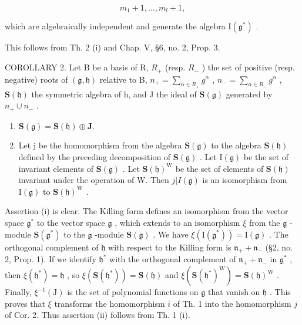 \[
m _ {1} + 1, \dots , m _ {l} + 1,
\]

which are algebraically independent and generate the algebra \(\mathrm{I}(\mathfrak{g}^*)\) .

This follows from Th. 2 (i) and Chap. V, §6, no. 2, Prop. 3.

COROLLARY 2. Let B be a basis of R, \(R_{+}\) (resp. \(R_{-}\) ) the set of positive (resp. negative) roots of \((\mathfrak{g},\mathfrak{h})\) relative to B, \(n_{+}=\sum_{\alpha\in R_{+}}g^{\alpha}\) , \(n_{-}=\sum_{\alpha\in R_{-}}g^{\alpha}\) , \(\mathbf{S}(\mathfrak{h})\) the symmetric algebra of h, and J the ideal of \(\mathbf{S}(\mathfrak{g})\) generated by \(n_{+}\cup n_{-}\) .

\begin{enumerate}
\def\labelenumi{(\roman{enumi})}
\item
  \(\mathbf{S}(\mathfrak{g}) = \mathbf{S}(\mathfrak{h}) \oplus \mathbf{J}.\)
\item
  Let j be the homomorphism from the algebra \(\mathbf{S}(\mathfrak{g})\) to the algebra \(\mathbf{S}(\mathfrak{h})\) defined by the preceding decomposition of \(\mathbf{S}(\mathfrak{g})\) . Let \(\mathrm{I}(\mathfrak{g})\) be the set of invariant elements of \(\mathbf{S}(\mathfrak{g})\) . Let \(\mathbf{S}(\mathfrak{h})^{\mathrm{W}}\) be the set of elements of \(\mathbf{S}(\mathfrak{h})\) invariant under the operation of W. Then \(j|I(\mathfrak{g})\) is an isomorphism from \(\mathrm{I}(\mathfrak{g})\) to \(\mathbf{S}(\mathfrak{h})^{\mathrm{W}}\) .
\end{enumerate}

Assertion (i) is clear. The Killing form defines an isomorphism from the vector space \(\mathfrak{g}^*\) to the vector space \(\mathfrak{g}\) , which extends to an isomorphism \(\xi\) from the \(\mathfrak{g}\) -module \(\mathbf{S}(\mathfrak{g}^*)\) to the \(\mathfrak{g}\) -module \(\mathbf{S}(\mathfrak{g})\) . We have \(\xi (\mathrm{I}(\mathfrak{g}^*)) = \mathrm{I}(\mathfrak{g})\) . The orthogonal complement of \(\mathfrak{h}\) with respect to the Killing form is \(\mathfrak{n}_{+} + \mathfrak{n}_{-}\) (§2, no. 2, Prop. 1). If we identify \(\mathfrak{h}^*\) with the orthogonal complement of \(\mathfrak{n}_{+} + \mathfrak{n}_{-}\) in \(\mathfrak{g}^*\) , then \(\xi (\mathfrak{h}^*) = \mathfrak{h}\) , so \(\xi (\mathbf{S}(\mathfrak{h}^*)) = \mathbf{S}(\mathfrak{h})\) and \(\xi (\mathbf{S}(\mathfrak{h}^*)^{\mathrm{W}}) = \mathbf{S}(\mathfrak{h})^{\mathrm{W}}\) . Finally, \(\xi^{-1}(\mathrm{J})\) is the set of polynomial functions on \(\mathfrak{g}\) that vanish on \(\mathfrak{h}\) . This proves that \(\xi\) transforms the homomorphism \(i\) of Th. 1 into the homomorphism \(j\) of Cor. 2. Thus assertion (ii) follows from Th. 1 (i).

